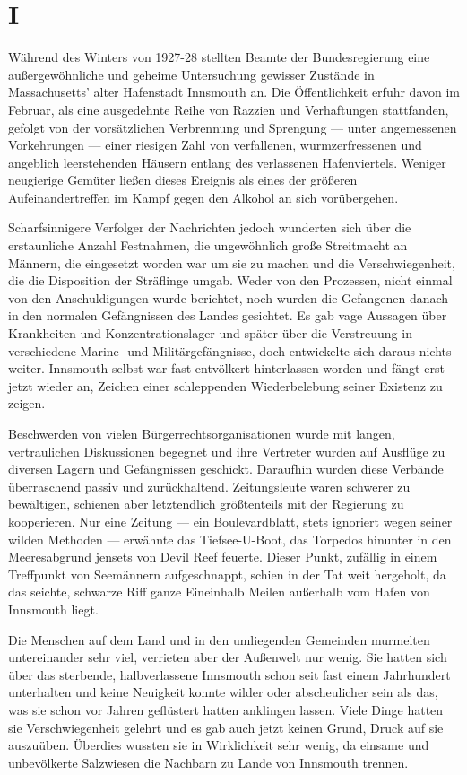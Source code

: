 \chapter*{I}

Während des Winters von 1927-28 stellten Beamte der Bundesregierung eine außergewöhnliche und geheime Untersuchung gewisser Zustände in Massachusetts' alter Hafenstadt Innsmouth an. Die Öffentlichkeit erfuhr davon im Februar, als eine ausgedehnte Reihe von Razzien und Verhaftungen stattfanden, gefolgt von der vorsätzlichen Verbrennung und Sprengung --- unter angemessenen Vorkehrungen --- einer riesigen Zahl von verfallenen, wurmzerfressenen und angeblich leerstehenden Häusern entlang des verlassenen Hafenviertels. Weniger neugierige Gemüter ließen dieses Ereignis als eines der größeren Aufeinandertreffen im Kampf gegen den Alkohol an sich vorübergehen.

Scharfsinnigere Verfolger der Nachrichten jedoch wunderten sich über die erstaunliche Anzahl Festnahmen, die ungewöhnlich große Streitmacht an Männern, die eingesetzt worden war um sie zu machen und die Verschwiegenheit, die die Disposition der Sträflinge umgab. Weder von den Prozessen, nicht einmal von den Anschuldigungen wurde berichtet, noch wurden die Gefangenen danach in den normalen Gefängnissen des Landes gesichtet. Es gab vage Aussagen über Krankheiten und Konzentrationslager und später über die Verstreuung in verschiedene Marine- und Militärgefängnisse, doch entwickelte sich daraus nichts weiter. Innsmouth selbst war fast entvölkert hinterlassen worden und fängt erst jetzt wieder an, Zeichen einer schleppenden Wiederbelebung seiner Existenz zu zeigen.

Beschwerden von vielen Bürgerrechtsorganisationen wurde mit langen, vertraulichen Diskussionen begegnet und ihre Vertreter wurden auf Ausflüge zu diversen Lagern und Gefängnissen geschickt. Daraufhin wurden diese Verbände überraschend passiv und zurückhaltend. Zeitungsleute waren schwerer zu bewältigen, schienen aber letztendlich größtenteils mit der Regierung zu kooperieren. Nur eine Zeitung --- ein Boulevardblatt, stets ignoriert wegen seiner wilden Methoden --- erwähnte das Tiefsee-U-Boot, das Torpedos hinunter in den Meeresabgrund jensets von Devil Reef feuerte. Dieser Punkt, zufällig in einem Treffpunkt von Seemännern aufgeschnappt, schien in der Tat weit hergeholt, da das seichte, schwarze Riff ganze Eineinhalb Meilen außerhalb vom Hafen von Innsmouth liegt.

Die Menschen auf dem Land und in den umliegenden Gemeinden murmelten untereinander sehr viel, verrieten aber der Außenwelt nur wenig. Sie hatten sich über das sterbende, halbverlassene Innsmouth schon seit fast einem Jahrhundert unterhalten und keine Neuigkeit konnte wilder oder abscheulicher sein als das, was sie schon vor Jahren geflüstert hatten anklingen lassen.
Viele Dinge hatten sie Verschwiegenheit gelehrt und es gab auch jetzt keinen Grund, Druck auf sie auszuüben. Überdies wussten sie in Wirklichkeit sehr wenig, da einsame und unbevölkerte Salzwiesen die Nachbarn zu Lande von Innsmouth trennen.


